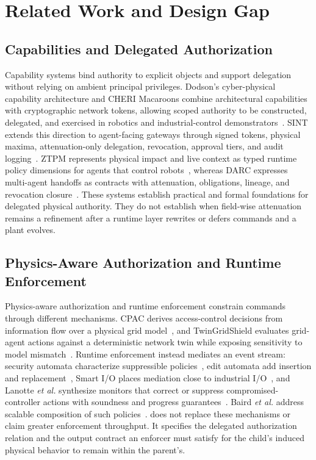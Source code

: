 \section{Related Work and Design Gap}
\label{sec:related}

\subsection{Capabilities and Delegated Authorization}

Capability systems bind authority to explicit objects and support delegation without relying on ambient principal privileges. Dodson's cyber-physical capability architecture and CHERI Macaroons combine architectural capabilities with cryptographic network tokens, allowing scoped authority to be constructed, delegated, and exercised in robotics and industrial-control demonstrators~\cite{dodson2021,dodson2020}. SINT extends this direction to agent-facing gateways through signed tokens, physical maxima, attenuation-only delegation, revocation, approval tiers, and audit logging~\cite{sint2026}. ZTPM represents physical impact and live context as typed runtime policy dimensions for agents that control robots~\cite{ranathunga2026}, whereas DARC expresses multi-agent handoffs as contracts with attenuation, obligations, lineage, and revocation closure~\cite{bamil2026}. These systems establish practical and formal foundations for delegated physical authority. They do not establish when field-wise attenuation remains a refinement after a runtime layer rewrites or defers commands and a plant evolves.

\subsection{Physics-Aware Authorization and Runtime Enforcement}

Physics-aware authorization and runtime enforcement constrain commands through different mechanisms. CPAC derives access-control decisions from information flow over a physical grid model~\cite{etigowni2016}, and TwinGridShield evaluates grid-agent actions against a deterministic network twin while exposing sensitivity to model mismatch~\cite{rafy2026}. Runtime enforcement instead mediates an event stream: security automata characterize suppressible policies~\cite{schneider2000}, edit automata add insertion and replacement~\cite{ligatti2005}, Smart I/O places mediation close to industrial I/O~\cite{pearce2020}, and Lanotte \emph{et al.} synthesize monitors that correct or suppress compromised-controller actions with soundness and progress guarantees~\cite{lanotte2023}. Baird \emph{et al.} address scalable composition of such policies~\cite{baird2024}. \zonecap{} does not replace these mechanisms or claim greater enforcement throughput. It specifies the delegated authorization relation and the output contract an enforcer must satisfy for the child's induced physical behavior to remain within the parent's.

